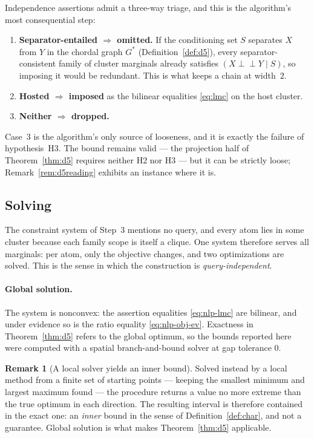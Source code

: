 \documentclass[11pt]{article}
\theoremstyle{definition}
\newtheorem{remark}{Remark}
\newcommand{\indep}{\perp\!\!\!\perp}
\begin{document}
Independence assertions admit a three-way triage, and this is the algorithm's most
consequential step:
\begin{enumerate}
  \item \textbf{Separator-entailed $\Rightarrow$ omitted.} If the conditioning set
    $S$ separates $X$ from $Y$ in the chordal graph $G^\ast$ (Definition~\ref{def:d5}),
    every separator-consistent family of cluster marginals already satisfies
    $(X\indep Y\mid S)$, so imposing it would be redundant. This is what keeps a
    chain at width~$2$.
  \item \textbf{Hosted $\Rightarrow$ imposed} as the bilinear equalities
    \eqref{eq:lmc} on the host cluster.
  \item \textbf{Neither $\Rightarrow$ dropped.}
\end{enumerate}
Case~3 is the algorithm's only source of looseness, and it is exactly the failure
of hypothesis~H3. The bound remains valid --- the projection half of
Theorem~\ref{thm:d5} requires neither H2 nor H3 --- but it can be strictly loose;
Remark~\ref{rem:d5reading} exhibits an instance where it is.

\subsection{Solving}\label{sec:algo-solve}

The constraint system of Step~3 mentions no query, and every atom lies in some
cluster because each family scope is itself a clique. One system therefore serves
all marginals: per atom, only the objective changes, and two optimizations are
solved. This is the sense in which the construction is \emph{query-independent}.

\paragraph{Global solution.}
The system is nonconvex: the assertion equalities \eqref{eq:nlp-lmc} are bilinear,
and under evidence so is the ratio equality \eqref{eq:nlp-obj-ev}. Exactness in
Theorem~\ref{thm:d5} refers to the global optimum, so the bounds reported here
were computed with a spatial branch-and-bound solver at gap tolerance $0$.

\begin{remark}[A local solver yields an inner bound]\label{rem:ipoptinner}
Solved instead by a local method from a finite set of starting points --- keeping
the smallest minimum and largest maximum found --- the procedure returns a value
no more extreme than the true optimum in each direction. The resulting interval is
therefore contained in the exact one: an \emph{inner} bound in the sense of
Definition~\ref{def:char}, and not a guarantee. Global solution is what makes
Theorem~\ref{thm:d5} applicable.
\end{remark}
\end{document}
